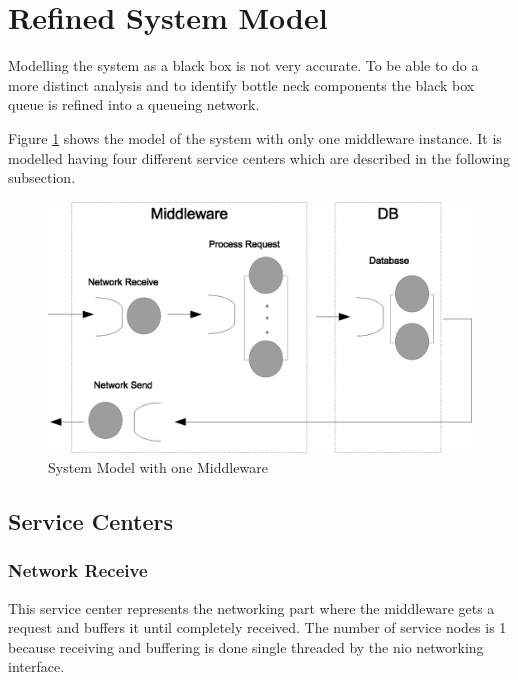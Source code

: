 \documentclass[a4paper]{article}
\begin{document}
\section{Refined System Model}

Modelling the system as a black box is not very accurate. To be able to do a more distinct analysis and to identify bottle neck components the black box queue is refined into a queueing network.

Figure \ref{fig:systemmodel-singlebroker} shows the model of the system with only one middleware instance. It is modelled having four different service centers which are described in the following subsection.


\begin{figure}[H]
	\begin{center}
    \includegraphics[scale=0.6]{../drawings-ms2/systemmodel-singlebroker.eps}
  \end{center}
  \caption{System Model with one Middleware}
  \label{fig:systemmodel-singlebroker}
\end{figure}


\subsection{Service Centers}
\subsubsection{Network Receive}
\label{subsub:ServiceCenterNetworkReceive}

This service center represents the networking part where the middleware gets a request and buffers it until completely received. The number of service nodes is 1 because receiving and buffering is done single threaded by the nio networking interface.\\
\end{document}
